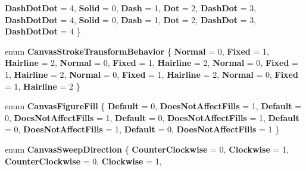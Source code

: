 \begin{DoxyCompactItemize}
{\bfseries Dash\+Dot\+Dot} = 4, 
{\bfseries Solid} = 0, 
\newline
{\bfseries Dash} = 1, 
{\bfseries Dot} = 2, 
{\bfseries Dash\+Dot} = 3, 
{\bfseries Dash\+Dot\+Dot} = 4, 
\newline
{\bfseries Solid} = 0, 
{\bfseries Dash} = 1, 
{\bfseries Dot} = 2, 
{\bfseries Dash\+Dot} = 3, 
\newline
{\bfseries Dash\+Dot\+Dot} = 4
 \}
\item 
\mbox{\label{namespace_microsoft_1_1_graphics_1_1_canvas_1_1_geometry_a79c0c14002e1ebbc20c430497d584867}} 
enum {\bfseries Canvas\+Stroke\+Transform\+Behavior} \{ \newline
{\bfseries Normal} = 0, 
{\bfseries Fixed} = 1, 
{\bfseries Hairline} = 2, 
{\bfseries Normal} = 0, 
\newline
{\bfseries Fixed} = 1, 
{\bfseries Hairline} = 2, 
{\bfseries Normal} = 0, 
{\bfseries Fixed} = 1, 
\newline
{\bfseries Hairline} = 2, 
{\bfseries Normal} = 0, 
{\bfseries Fixed} = 1, 
{\bfseries Hairline} = 2, 
\newline
{\bfseries Normal} = 0, 
{\bfseries Fixed} = 1, 
{\bfseries Hairline} = 2
 \}
\item 
\mbox{\label{namespace_microsoft_1_1_graphics_1_1_canvas_1_1_geometry_aff867f5434d5804c2b0bcc7ada82e275}} 
enum {\bfseries Canvas\+Figure\+Fill} \{ \newline
{\bfseries Default} = 0, 
{\bfseries Does\+Not\+Affect\+Fills} = 1, 
{\bfseries Default} = 0, 
{\bfseries Does\+Not\+Affect\+Fills} = 1, 
\newline
{\bfseries Default} = 0, 
{\bfseries Does\+Not\+Affect\+Fills} = 1, 
{\bfseries Default} = 0, 
{\bfseries Does\+Not\+Affect\+Fills} = 1, 
\newline
{\bfseries Default} = 0, 
{\bfseries Does\+Not\+Affect\+Fills} = 1
 \}
\item 
\mbox{\label{namespace_microsoft_1_1_graphics_1_1_canvas_1_1_geometry_ac9b0f6a16960b87589d16512e46f64c1}} 
enum {\bfseries Canvas\+Sweep\+Direction} \{ \newline
{\bfseries Counter\+Clockwise} = 0, 
{\bfseries Clockwise} = 1, 
{\bfseries Counter\+Clockwise} = 0, 
{\bfseries Clockwise} = 1, 

\end{DoxyCompactItemize}

